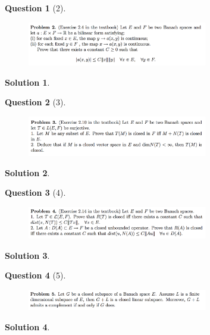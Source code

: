 \documentclass{article} %
\theoremstyle{quest}
\newtheorem*{question}{Question}
\newtheorem*{solution}{Solution}
\begin{document}
\newpage

\begin{question}[2]
\hfill
\begin{figure}[h!]
  \centering
    \includegraphics[width=0.7\textwidth]{funcA-h-e2-p2.png}
\end{figure}
\end{question}
\begin{solution} \hfill \\
\end{solution}

\newpage

\begin{question}[3]
\hfill
\begin{figure}[h!]
  \centering
    \includegraphics[width=0.7\textwidth]{funcA-h-e2-p3.png}
\end{figure}
\end{question}
\begin{solution} \hfill \\
\end{solution}

\newpage

\begin{question}[4]
\hfill
\begin{figure}[h!]
  \centering
    \includegraphics[width=0.7\textwidth]{funcA-h-e2-p4.png}
\end{figure}
\end{question}
\begin{solution} \hfill \\
\end{solution}

\newpage

\begin{question}[5]
\hfill
\begin{figure}[h!]
  \centering
    \includegraphics[width=0.7\textwidth]{funcA-h-e2-p5.png}
\end{figure}
\end{question}
\begin{solution} \hfill \\
\end{solution}
\end{document}
